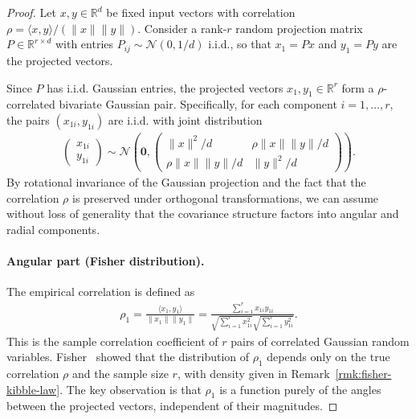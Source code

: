 \begin{proof}
\label{proof:fisher_kibble}
Let \(x, y \in \mathbb{R}^d\) be fixed input vectors with correlation \(\rho = \langle x, y\rangle/(\|x\|\|y\|)\). Consider a rank-\(r\) random projection matrix \(P \in \mathbb{R}^{r \times d}\) with entries \(P_{ij} \sim \mathcal{N}(0, 1/d)\) i.i.d., so that \(x_1 = Px\) and \(y_1 = Py\) are the projected vectors.

Since \(P\) has i.i.d. Gaussian entries, the projected vectors \(x_1, y_1 \in \mathbb{R}^r\) form a \(\rho\)-correlated bivariate Gaussian pair. Specifically, for each component \(i = 1, \dots, r\), the pairs \((x_{1i}, y_{1i})\) are i.i.d. with joint distribution
\begin{align}
\begin{pmatrix} x_{1i} \\ y_{1i} \end{pmatrix} \sim \mathcal{N}\left(\mathbf{0}, \begin{pmatrix} \|x\|^2/d & \rho \|x\|\|y\|/d \\ \rho \|x\|\|y\|/d & \|y\|^2/d \end{pmatrix}\right).
\end{align}
By rotational invariance of the Gaussian projection and the fact that the correlation \(\rho\) is preserved under orthogonal transformations, we can assume without loss of generality that the covariance structure factors into angular and radial components.

\paragraph{Angular part (Fisher distribution).}
The empirical correlation is defined as
\begin{align}
\rho_1 = \frac{\langle x_1, y_1 \rangle}{\|x_1\|\|y_1\|} = \frac{\sum_{i=1}^r x_{1i} y_{1i}}{\sqrt{\sum_{i=1}^r x_{1i}^2}\sqrt{\sum_{i=1}^r y_{1i}^2}}.
\end{align}
This is the sample correlation coefficient of \(r\) pairs of correlated Gaussian random variables. Fisher~\cite{fisher1915probable,hotelling1953new} showed that the distribution of \(\rho_1\) depends only on the true correlation \(\rho\) and the sample size \(r\), with density given in Remark~\ref{rmk:fisher-kibble-law}. The key observation is that \(\rho_1\) is a function purely of the angles between the projected vectors, independent of their magnitudes.


\end{proof}
